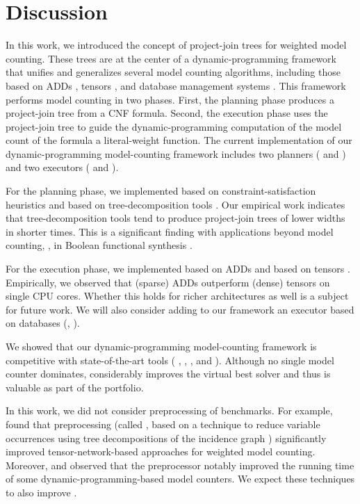 \section{Discussion}
\label{sec_discussion}

In this work, we introduced the concept of project-join trees for weighted model counting.
These trees are at the center of a dynamic-programming framework that unifies and generalizes several model counting algorithms, including those based on ADDs \cite{DPV20}, tensors \cite{DDV19}, and database management systems \cite{fichte2020exploiting}.
This framework performs model counting in two phases.
First, the planning phase produces a project-join tree from a CNF formula.
Second, the execution phase uses the project-join tree to guide the dynamic-programming computation of the model count of the formula \wrt{} a literal-weight function.
The current implementation of our dynamic-programming model-counting framework \Dpmc{} includes two planners (\Htb{} and \Lg) and two executors (\Dmc{} and \Tensor{}).

For the planning phase, we implemented \Htb{} based on constraint-satisfaction heuristics
\cite{tarjan1984simple,koster2001treewidth,dechter03,dechter99,bouquet1999gestion}
and \Lg{} based on tree-decomposition tools \cite{strasser2017computing,Tamaki17,AMW17}.
Our empirical work indicates that tree-decomposition tools tend to produce project-join trees of lower widths in shorter times.
This is a significant finding with applications beyond model counting, \eg, in Boolean functional synthesis \cite{tabajara2017factored}.

For the execution phase, we implemented \Dmc{} based on ADDs \cite{DPV20,somenzi2015cudd} and \Tensor{} based on tensors \cite{DDV19,numpy}.
Empirically, we observed that (sparse) ADDs outperform (dense) tensors on single CPU cores.
Whether this holds for richer architectures as well is a subject for future work.
We will also consider adding to our framework an executor based on databases (\eg, \cite{fichte2020exploiting}).

We showed that our dynamic-programming model-counting framework \Dpmc{} is competitive with state-of-the-art tools (\cachet{} \cite{sang2004combining}, \ctd{} \cite{darwiche2004new}, \df{} \cite{LM17}, and \minictd{} \cite{OD15}).
Although no single model counter dominates,
\Dpmc{} considerably improves the virtual best solver and thus is valuable as part of the portfolio.

In this work, we did not consider preprocessing of benchmarks.
For example, \cite{DDV19} found that preprocessing (called , based on a technique to reduce variable occurrences using tree decompositions of the incidence graph \cite{SS10_2}) significantly improved tensor-network-based approaches for weighted model counting.
Moreover, \cite{fichte2019improved} and \cite{dudek2020parallel} observed that the  preprocessor \cite{LM14} notably improved the running time of some dynamic-programming-based model counters.
We expect these techniques to also improve .

